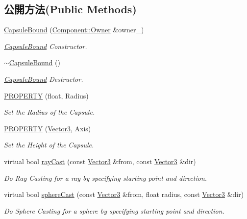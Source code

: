 \subsection*{公開方法(Public Methods)}
\begin{DoxyCompactItemize}
\item 
\hyperlink{class_i_dream_sky_1_1_capsule_bound_a45ffd80c8bf8d1ee62534349ad3f538a}{Capsule\+Bound} (\hyperlink{class_i_dream_sky_1_1_component_1_1_owner}{Component\+::\+Owner} \&owner\+\_\+)
\begin{DoxyCompactList}\small\item\em \hyperlink{class_i_dream_sky_1_1_capsule_bound}{Capsule\+Bound} Constructor. \end{DoxyCompactList}\item 
\hyperlink{class_i_dream_sky_1_1_capsule_bound_affadace6b799e24ec71123ac3d900e9f}{$\sim$\+Capsule\+Bound} ()
\begin{DoxyCompactList}\small\item\em \hyperlink{class_i_dream_sky_1_1_capsule_bound}{Capsule\+Bound} Destructor. \end{DoxyCompactList}\item 
\hyperlink{class_i_dream_sky_1_1_capsule_bound_a776c9ac4343ce918e4d88aa6a259546b}{P\+R\+O\+P\+E\+R\+TY} (float, Radius)
\begin{DoxyCompactList}\small\item\em Set the Radius of the Capsule. \end{DoxyCompactList}\item 
\hyperlink{class_i_dream_sky_1_1_capsule_bound_a4e2e003d6f0f478166140b6cc4d9f668}{P\+R\+O\+P\+E\+R\+TY} (\hyperlink{class_i_dream_sky_1_1_vector3}{Vector3}, Axis)
\begin{DoxyCompactList}\small\item\em Set the Height of the Capsule. \end{DoxyCompactList}\item 
virtual bool \hyperlink{class_i_dream_sky_1_1_capsule_bound_ae0cacec055e7f03d46091f9ac47a8c09}{ray\+Cast} (const \hyperlink{class_i_dream_sky_1_1_vector3}{Vector3} \&from, const \hyperlink{class_i_dream_sky_1_1_vector3}{Vector3} \&dir)
\begin{DoxyCompactList}\small\item\em Do Ray Casting for a ray by specifying starting point and direction. \end{DoxyCompactList}\item 
virtual bool \hyperlink{class_i_dream_sky_1_1_capsule_bound_a91d978bfd2dded0d9e0c3528c1941b70}{sphere\+Cast} (const \hyperlink{class_i_dream_sky_1_1_vector3}{Vector3} \&from, float radius, const \hyperlink{class_i_dream_sky_1_1_vector3}{Vector3} \&dir)
\begin{DoxyCompactList}\small\item\em Do Sphere Casting for a sphere by specifying starting point and direction. \end{DoxyCompactList}\end{DoxyCompactItemize}


